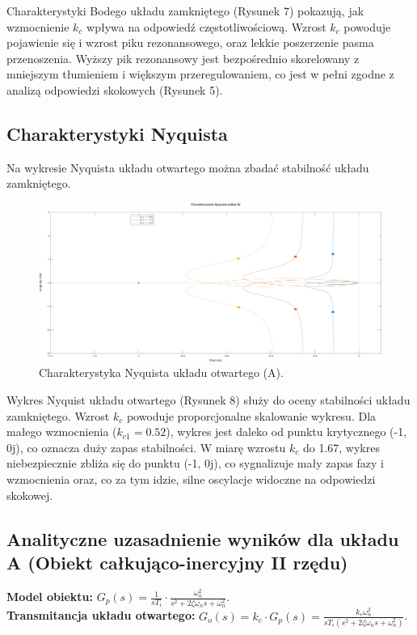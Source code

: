 \documentclass[12pt,a4paper]{article}
\begin{document}
	Charakterystyki Bodego układu zamkniętego (Rysunek 7) pokazują, jak wzmocnienie $k_c$ wpływa na odpowiedź częstotliwościową. Wzrost $k_c$ powoduje pojawienie się i wzrost piku rezonansowego, oraz lekkie poszerzenie pasma przenoszenia. Wyższy pik rezonansowy jest bezpośrednio skorelowany z mniejszym tłumieniem i większym przeregulowaniem, co jest w pełni zgodne z analizą odpowiedzi skokowych (Rysunek 5).
	
	\subsection{Charakterystyki Nyquista}
	Na wykresie Nyquista układu otwartego można zbadać stabilność układu zamkniętego.
	
	\begin{figure}[H]
		\centering
		\includegraphics[width=0.8\linewidth]{zdjecia/NQ_ukladA.png}
		\caption{Charakterystyka Nyquista układu otwartego (A).}
		\label{fig:NQ_ukladA}
	\end{figure}

	Wykres Nyquist układu otwartego (Rysunek 8) służy do oceny stabilności układu zamkniętego. Wzrost $k_c$ powoduje proporcjonalne skalowanie wykresu. Dla małego wzmocnienia ($k_{c1}=0.52$), wykres jest daleko od punktu krytycznego (-1, 0j), co oznacza duży zapas stabilności. W miarę wzrostu $k_c$ do 1.67, wykres niebezpiecznie zbliża się do punktu (-1, 0j), co sygnalizuje mały zapas fazy i wzmocnienia oraz, co za tym idzie, silne oscylacje widoczne na odpowiedzi skokowej.
	
	\subsection{Analityczne uzasadnienie wyników dla układu A (Obiekt całkująco-inercyjny II rzędu)}
	
	\textbf{Model obiektu:} $G_p(s) = \frac{1}{sT_i} \cdot \frac{\omega_n^2}{s^2 + 2\zeta\omega_n s + \omega_n^2}$. \\
	\textbf{Transmitancja układu otwartego:} $G_o(s) = k_c \cdot G_p(s) = \frac{k_c \omega_n^2}{sT_i(s^2 + 2\zeta\omega_n s + \omega_n^2)}$.
	
\end{document}
